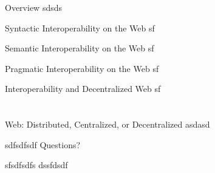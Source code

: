 \documentclass[10pt]{beamer}
\begin{document}
\begin{frame}[fragile]{Overview}
  sdsds
\end{frame}

\begin{frame}[fragile]{Syntactic Interoperability on the Web}
sf
\end{frame}

\begin{frame}[fragile]{Semantic Interoperability on the Web}
sf
\end{frame}

\begin{frame}[fragile]{Pragmatic Interoperability on the Web}
sf
\end{frame}

\begin{frame}[fragile]{Interoperability and Decentralized Web}
sf
\end{frame}


\section{}

\begin{frame}{Web: Distributed, Centralized, or Decentralized}
  asdasd
\end{frame}

\begin{frame}[allowframebreaks]{sdfsdfsdf}
  Questions?
\end{frame}

\appendix

\begin{frame}[fragile]{sfsdfsdfs}
  dssfdsdf
\end{frame}
\end{document}
